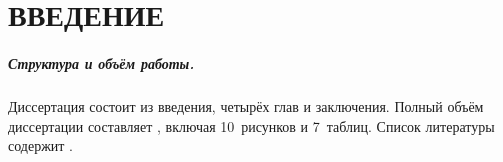\chapter*{ВВЕДЕНИЕ}



\ifsynopsis
\else
{}
\paragraph{Структура и объём работы.}
%
%
Диссертация состоит из введения, четырёх глав и заключения.
Полный объём диссертации составляет , включая 10~рисунков и 7~таблиц.
Список литературы содержит .
\fi
